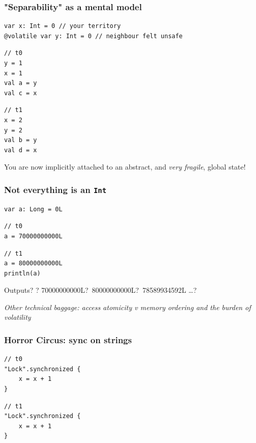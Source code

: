 \documentclass[aspectratio=1610, xcolor={dvipsnames}]{beamer}
\begin{document}
\begin{frame}[fragile]
    \frametitle{"Separability" as a mental model}

    
\begin{lstlisting}
var x: Int = 0 // your territory
@volatile var y: Int = 0 // neighbour felt unsafe 
\end{lstlisting}
            \begin{multicols}{2}
                \begin{lstlisting}
// t0
y = 1
x = 1
val a = y
val c = x
                \end{lstlisting}
        
                \columnbreak
        
                \begin{lstlisting}
// t1
x = 2
y = 2
val b = y
val d = x
                \end{lstlisting}
            \end{multicols}

\pause
You are now implicitly attached to an abstract, and \emph{very fragile}, global
state! 

\end{frame}


\begin{frame}[fragile]
    \frametitle{Not everything is an \lstinline|Int|}

    \begin{lstlisting}
var a: Long = 0L
    \end{lstlisting}
    \begin{multicols}{2}
        \begin{lstlisting}
// t0
a = 70000000000L
        \end{lstlisting}

        \columnbreak

        \begin{lstlisting}
// t1
a = 80000000000L
println(a)
        \end{lstlisting}
    \end{multicols}

    Outputs? ? \pause 70000000000L?\pause ~80000000000L?\pause  ~78589934592L \dots?

    \pause \emph{Other technical baggage: access atomicity v memory ordering and the burden of volatility}

\end{frame}

\begin{frame}[fragile]
    \frametitle{Horror Circus: sync on strings}

\begin{multicols}{2}
\begin{lstlisting}
// t0
"Lock".synchronized {
    x = x + 1
} 
\end{lstlisting}
\columnbreak

\begin{lstlisting}
// t1
"Lock".synchronized {
    x = x + 1
} 
\end{lstlisting}
\end{multicols}

\end{frame}
\end{document}
